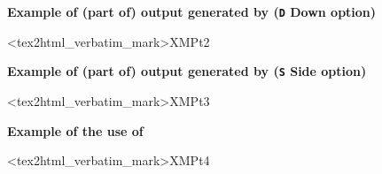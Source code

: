 \batchmode

\makeatletter
\makeindex
\newcommand{\FZfile}{FZ~file\index{FZ!Sequential input/output}\index{input/output!FZ}}
\newcommand{\RZfile}{RZ~file\index{RZ!Random input/output}\index{input/output!RZ}}
\newcommand{\IQUEST}{\Lit{IQUEST}\index{IQUEST@{\tt IQUEST}!user communication vector in common {\tt QUEST}}\index{IQUEST@{\tt IQUEST}!error reporting}\index{error reporting!{\tt IQUEST}}\index{QUEST@{\tt QUEST}!user communication common}}
\newcommand{\QUEST}{\Lit{QUEST}\index{IQUEST@{\tt IQUEST}!user communication vector in common {\tt QUEST}}\index{IQUEST@{\tt IQUEST}!error reporting}\index{error reporting!{\tt IQUEST}}\index{QUEST@{\tt QUEST}!user communication common}}
\renewcommand{\ZEBRA}{\textsc{ZEBRA}}
\renewcommand{\Copt}[1]{\texttt{#1}}
\renewcommand{\Ropt}[1]{\texttt{#1}}
\renewcommand{\Rarg}[1]{\texttt{#1}}
\def\condbreak#1{}
\setlongtables
\makeindex
{}
\PScommands\setcounter{secnumdepth}{3}
\setcounter{tocdepth}{2}
\newenvironment{landscapebody}{\begin{landscape}}{\end{landscape}}
\makeatletter
\def\LS@rot{\setbox\@outputbox=\vbox{\@rotr\@outputbox}}
\makeatother
\long{}
\renewcommand{\ZEBRA}{\textsc{ZEBRA}}\renewcommand{\Copt}[1]{\texttt{#1}}\renewcommand{\Ropt}[1]{\texttt{#1}}\renewcommand{\Rarg}[1]{\texttt{#1}}\def\condbreak#1{}\def\LS@rot{\setbox\@outputbox=\vbox{\@rotr\@outputbox}}\def\NODOC#1{#1}
\makeatother
\newenvironment{tex2html_wrap}{}{}
\usepackage{screen}

\pagestyle{empty}
\newpage

{\samepage \clearpage \begin{landscape}\mbox{}\vspace*{1cm}
\centerline{\textbf{{Example of (part of) output generated by  (\Ropt{D} Down option)}}}<tex2html_verbatim_mark>XMPt2
\newpage
\mbox{}\vspace*{1cm}
\centerline{\textbf{{Example of (part of) output generated by  (\Ropt{S} Side option)}}}<tex2html_verbatim_mark>XMPt3
\end{landscape}
}


\newpage

{\samepage \clearpage \begin{landscape}\mbox{}\vspace*{1cm}
\centerline{\textbf{{Example of the use of }}}<tex2html_verbatim_mark>XMPt4
\end{landscape}
}


